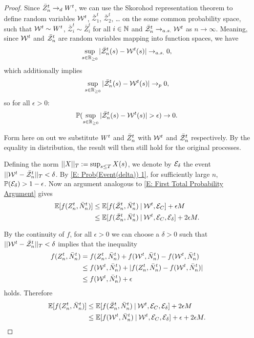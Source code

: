 \begin{proof}
Since $\bar{Z}^t_n \rightarrow_d W^t$, we can use the Skorohod representation theorem to define random variables 
$\mathcal{W}^t$, $\bar{\mathcal{Z}}^t_1$, $\bar{\mathcal{Z}}^t_2$, \dots
on the some common probability space, such that $\mathcal{W}^t \sim W^t$, $\bar{\mathcal{Z}}^t_i \sim \bar{Z}^t_i$ for all $i \in \mathbb{N}$
and $\bar{\mathcal{Z}}^t_n \rightarrow_{a.s.} \mathcal{W}^t$ as $n \rightarrow \infty$.
Meaning, since $\mathcal{W}^t$ and $\bar{\mathcal{Z}}^t_n$ are random variables mapping into function spaces, we have
\begin{equation}
\sup_{s \in \mathbb{R}_{\geq 0}} |\bar{\mathcal{Z}}^t_n(s) - \mathcal{W}^t(s)| \rightarrow_{a.s.} 0,
\end{equation}
which additionally implies
\begin{equation} 
\sup_{s \in \mathbb{R}_{\geq 0}} |\bar{\mathcal{Z}}^t_n(s) - \mathcal{W}^t(s)| \rightarrow_p 0,
\end{equation}
so for all $\epsilon > 0$:
\begin{equation} \label{E: Prob(Event(delta)) 1}
\mathbb{P}( \sup_{s \in \mathbb{R}_{\geq 0}} |\bar{\mathcal{Z}}^t_n(s) - \mathcal{W}^t(s)| > \epsilon ) \rightarrow 0.
\end{equation}

Form here on out we substitute $W^t$ and $\bar{Z}^t_n$ with $\mathcal{W}^t$ and $\bar{\mathcal{Z}}^t_n$ respectively.
By the equality in distribution, the result will then still hold for the original processes.

Defining the norm $||X||_T := \sup_{s \leq T}X(s)$, we denote by $\mathcal{E}_{\delta}$ the event $||\mathcal{W}^t - \bar{\mathcal{Z}}^t_n||_T < \delta$.
By \eqref{E: Prob(Event(delta)) 1}, for sufficiently large $n$, $\mathbb{P}(\mathcal{E}_{\delta}) > 1 - \epsilon$.
Now an argument analogous to \eqref{E: First Total Probability Argument} gives
\begin{equation} \label{E: Estimation step 2}
\begin{aligned}
\mathbb{E}[f(Z_n^t, \bar{N}_n^t)] 
&\leq \mathbb{E}[f(\bar{\mathcal{Z}}^t_n, \bar{N}_n^t) \: | \: \mathcal{W}^t, \mathcal{E}_{C}] + \epsilon M \\
&\leq \mathbb{E}[f(\bar{\mathcal{Z}}^t_n, \bar{N}_n^t) \: | \: \mathcal{W}^t, \mathcal{E}_{C}, \mathcal{E}_{\delta}] + 2 \epsilon M.
\end{aligned}
\end{equation}

By the continuity of $f$, for all $\epsilon>0$ we can choose a $\delta > 0$ such that $||\mathcal{W}^t - \bar{\mathcal{Z}}^t_n||_T < \delta$ implies
that the inequality
\begin{equation*}
\begin{aligned}
f(Z_n^t, \bar{N}_n^t) &= f(Z_n^t, \bar{N}_n^t) + f(\mathcal{W}^t, \bar{N}_n^t) - f(\mathcal{W}^t, \bar{N}_n^t) \\
&\leq f(\mathcal{W}^t, \bar{N}_n^t) + |f(Z_n^t, \bar{N}_n^t) - f(\mathcal{W}^t, \bar{N}_n^t)| \\
&\leq f(\mathcal{W}^t, \bar{N}_n^t) + \epsilon
\end{aligned}
\end{equation*}
holds. Therefore
\begin{equation} \label{E: Estimation step 3}
\begin{aligned}
\mathbb{E}[f(Z_n^t, \bar{N}_n^t)] 
&\leq \mathbb{E}[f(\bar{\mathcal{Z}}^t_n, \bar{N}_n^t) \: | \: \mathcal{W}^t, \mathcal{E}_{C}, \mathcal{E}_{\delta}] + 2 \epsilon M \\
&\leq \mathbb{E}[f(\mathcal{W}^t, \bar{N}_n^t) \: | \: \mathcal{W}^t, \mathcal{E}_{C}, \mathcal{E}_{\delta}] + \epsilon + 2 \epsilon M.
\end{aligned}
\end{equation}


\end{proof}
